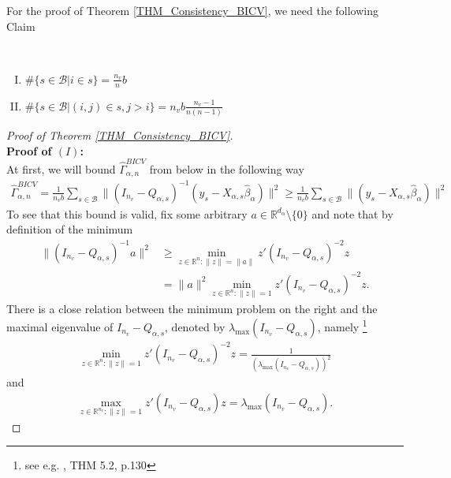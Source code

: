 \documentclass[Research_Module_ES.tex]{subfiles}
\begin{document}
For the proof of Theorem \ref{THM_Consistency_BICV}, we need the following Claim
\begin{claim}~
	\label{Claim_BICV}
	\begin{enumerate}[(I)]
		\item $\#\{s\in \mathcal{B}| i\in s\} = \frac{n_v}{n} b$ 
		\item $\#\{s\in\mathcal{B}|(i,j)\in s, j>i\}=n_vb\frac{n_v-1}{n(n-1)}$
	\end{enumerate}
\end{claim}

\begin{proof}[Proof of Theorem \ref{THM_Consistency_BICV}]~\\
	\textbf{Proof of $(I)$:}\\
	At first, we will bound $\hat{\Gamma}_{\alpha,n}^{BICV}$ from below in the following way
	\begin{align*}
	\hat{\Gamma}_{\alpha,n}^{BICV} 
	= \frac{1}{n_vb}\sum_{s\in \mathcal{B}}\lVert (I_{n_v}-Q_{\alpha,s})^{-1}(y_s-X_{\alpha,s}\hat{\beta}_\alpha)\rVert^2 
	\ge \frac{1}{n_vb}\sum_{s\in \mathcal{B}}\lVert (y_s-X_{\alpha,s}\hat{\beta}_\alpha)\rVert^2 
	\end{align*}
	To see that this bound is valid, fix some arbitrary $a\in \mathbb{R}^{d_\alpha}\setminus \{ 0\}$ and note that by definition of the minimum
	\begin{align}
	\lVert (I_{n_v}-Q_{\alpha,s})^{-1} a\rVert ^2 
	&\ge \min_{z\in \mathbb{R}^n : \lVert z\rVert=\lVert a\rVert}z'(I_{n_v}-Q_{\alpha,s})^{-2}z \nonumber\\
	&= \lVert a\rVert^2 \min_{z\in \mathbb{R}^n : \lVert z\rVert=1}z'(I_{n_v}-Q_{\alpha,s})^{-2}z. \label{proof_BICV_7}
	\end{align}
	There is a close relation between the minimum problem on the right and the maximal eigenvalue of $I_{n_v}-Q_{\alpha,s}$, denoted by $\lambda_{\max}(I_{n_v}-Q_{\alpha,s})$, namely \footnote{see e.g. \cite{ryabenkii}, THM 5.2, p.130}
	\begin{align}
	\min_{z\in \mathbb{R}^n : \lVert z\rVert=1}z'(I_{n_v}-Q_{\alpha,s})^{-2}z = \frac{1}{(\lambda_{\max}(I_{n_v}-Q_{\alpha,s}))^2}\label{proof_BICV_8}
	\end{align}
	and 
	\begin{align*}
	\max_{z\in \mathbb{R}^{n_v} : \lVert z\rVert=1}z'(I_{n_v}-Q_{\alpha,s})z=\lambda_{\max}(I_{n_v}-Q_{\alpha,s}).
	\end{align*}

\end{proof}
\end{document}
